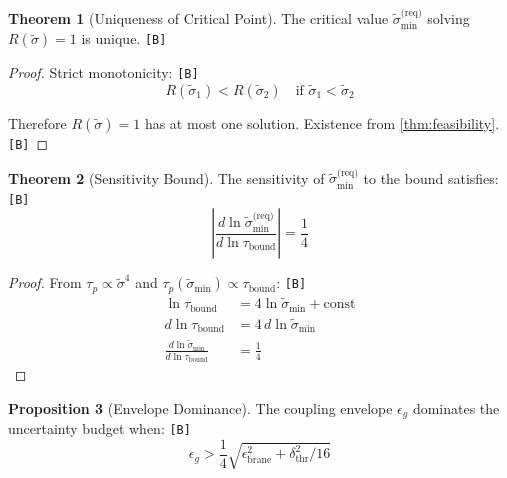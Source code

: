 \documentclass[11pt,a4paper]{article}
\newcommand{\tagB}{\textcolor{purple!70!black}{\texttt{[B]}}}
\theoremstyle{definition}
\newtheorem{theorem}{Theorem}[section]
\newtheorem{proposition}[theorem]{Proposition}
\begin{document}
\begin{theorem}[Uniqueness of Critical Point]
\label{thm:uniqueness}
The critical value $\tilde{\sigma}_{\min}^{\text{(req)}}$ solving $R(\tilde{\sigma}) = 1$ is unique. \tagB{}
\end{theorem}

\begin{proof}
Strict monotonicity: \tagB{}
\begin{equation}
\label{eq:thm2-strict}
R(\tilde{\sigma}_1) < R(\tilde{\sigma}_2) \quad \text{if } \tilde{\sigma}_1 < \tilde{\sigma}_2
\end{equation}

Therefore $R(\tilde{\sigma}) = 1$ has at most one solution. Existence from \cref{thm:feasibility}. \tagB{}
\end{proof}

\begin{theorem}[Sensitivity Bound]
\label{thm:sensitivity}
The sensitivity of $\tilde{\sigma}_{\min}^{\text{(req)}}$ to the bound satisfies: \tagB{}
\begin{equation}
\label{eq:thm3-sens}
\left|\frac{d\ln\tilde{\sigma}_{\min}^{\text{(req)}}}{d\ln\tau_{\text{bound}}}\right| = \frac{1}{4}
\end{equation}
\end{theorem}

\begin{proof}
From $\tau_p \propto \tilde{\sigma}^4$ and $\tau_p(\tilde{\sigma}_{\min}) \propto \tau_{\text{bound}}$: \tagB{}
\begin{align}
\label{eq:thm3-proof-1}
\ln\tau_{\text{bound}} &= 4\ln\tilde{\sigma}_{\min} + \text{const} \\
\label{eq:thm3-proof-2}
d\ln\tau_{\text{bound}} &= 4 \, d\ln\tilde{\sigma}_{\min} \\
\label{eq:thm3-proof-3}
\frac{d\ln\tilde{\sigma}_{\min}}{d\ln\tau_{\text{bound}}} &= \frac{1}{4}
\end{align}
\end{proof}

\begin{proposition}[Envelope Dominance]
\label{prop:envelope}
The coupling envelope $\epsilon_g$ dominates the uncertainty budget when: \tagB{}
\begin{equation}
\label{eq:prop-condition}
\epsilon_g > \frac{1}{4}\sqrt{\epsilon_{\text{brane}}^2 + \delta_{\text{thr}}^2/16}
\end{equation}
\end{proposition}
\end{document}
